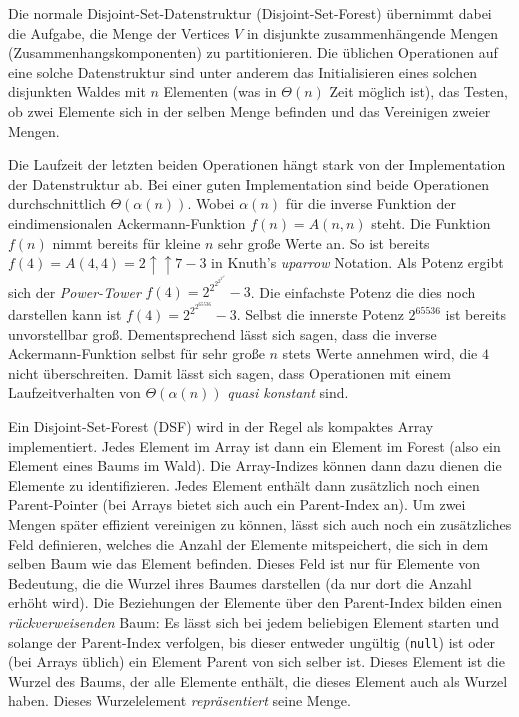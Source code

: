 \documentclass{whswinvcbook}
\begin{document}
Die normale Disjoint-Set-Datenstruktur (Disjoint-Set-Forest) \cite{dsf} übernimmt dabei die Aufgabe, die Menge der Vertices $V$ in disjunkte zusammenhängende Mengen (Zusammenhangskomponenten) zu partitionieren. Die üblichen Operationen auf eine solche Datenstruktur sind unter anderem das Initialisieren eines solchen disjunkten Waldes mit $n$ Elementen (was in $\Theta(n)$ Zeit möglich ist), das Testen, ob zwei Elemente sich in der selben Menge befinden und das Vereinigen zweier Mengen.

Die Laufzeit der letzten beiden Operationen hängt stark von der Implementation der Datenstruktur ab. Bei einer guten Implementation sind beide Operationen durchschnittlich $\Theta(\alpha(n))$.\cite{dsf-log,dsf-lower,tarjan,tarjan2,tarjan3} Wobei $\alpha(n)$ für die inverse Funktion der eindimensionalen Ackermann-Funktion $f(n)=A(n,n)$ steht. Die Funktion $f(n)$ nimmt bereits für kleine $n$ sehr große Werte an. So ist bereits $f(4)=A(4,4)=2\uparrow\uparrow7-3$ in Knuth's \textit{uparrow} Notation. Als Potenz ergibt sich der \textit{Power-Tower} $f(4)=2^{2^{2^{2^{2^{2^2}}}}}-3$. Die einfachste Potenz die dies noch darstellen kann ist $f(4)=2^{2^{2^{65536}}}-3$. Selbst die innerste Potenz $2^{65536}$ ist bereits unvorstellbar groß. Dementsprechend lässt sich sagen, dass die inverse Ackermann-Funktion selbst für sehr große $n$ stets Werte annehmen wird, die $4$ nicht überschreiten. Damit lässt sich sagen, dass Operationen mit einem Laufzeitverhalten von $\Theta(\alpha(n))$ \textit{quasi konstant} sind.

Ein Disjoint-Set-Forest (DSF) wird in der Regel als kompaktes Array implementiert. Jedes Element im Array ist dann ein Element im Forest (also ein Element eines Baums im Wald). Die Array-Indizes können dann dazu dienen die Elemente zu identifizieren. Jedes Element enthält dann zusätzlich noch einen Parent-Pointer (bei Arrays bietet sich auch ein Parent-Index an). Um zwei Mengen später effizient vereinigen zu können, lässt sich auch noch ein zusätzliches Feld definieren, welches die Anzahl der Elemente mitspeichert, die sich in dem selben Baum wie das Element befinden. Dieses Feld ist nur für Elemente von Bedeutung, die die Wurzel ihres Baumes darstellen (da nur dort die Anzahl erhöht wird). Die Beziehungen der Elemente über den Parent-Index bilden einen \textit{rückverweisenden} Baum: Es lässt sich bei jedem beliebigen Element starten und solange der Parent-Index verfolgen, bis dieser entweder ungültig (\texttt{null}) ist oder (bei Arrays üblich) ein Element Parent von sich selber ist. Dieses Element ist die Wurzel des Baums, der alle Elemente enthält, die dieses Element auch als Wurzel haben. Dieses Wurzelelement \textit{repräsentiert} seine Menge.
\end{document}
